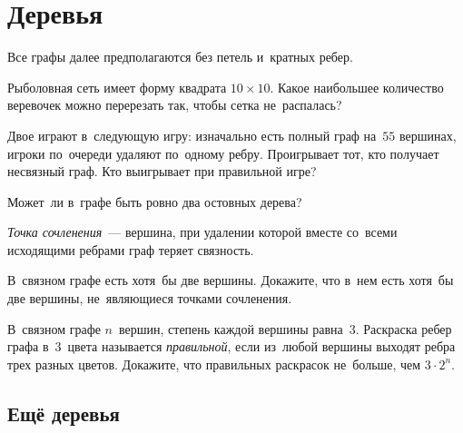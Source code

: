 
\section*{Деревья}


Все графы далее предполагаются без петель и~кратных ребер.

\begin{problems}

\item
Рыболовная сеть имеет форму квадрата $10 \times 10$.
Какое наибольшее количество веревочек можно перерезать так, чтобы сетка
не~распалась?

\item
Двое играют в~следующую игру: изначально есть полный граф на~$55$ вершинах,
игроки по~очереди удаляют по~одному ребру.
Проигрывает тот, кто получает несвязный граф.
Кто выигрывает при правильной игре?

\item
Может~ли в~графе быть ровно два остовных дерева?

\end{problems}

\emph{Точка сочленения}~--- вершина, при удалении которой вместе со~всеми
исходящими ребрами граф теряет связность.

\begin{problems}

\item
В~связном графе есть хотя~бы две вершины.
Докажите, что в~нем есть хотя~бы две вершины, не~являющиеся точками сочленения.

\item
В~связном графе $n$~вершин, степень каждой вершины равна~$3$.
Раскраска ребер графа в~$3$~цвета называется \emph{правильной}, если из~любой
вершины выходят ребра трех разных цветов.
Докажите, что правильных раскрасок не~больше, чем $3 \cdot 2^n$.

\end{problems}

\subsection*{Ещё деревья}

